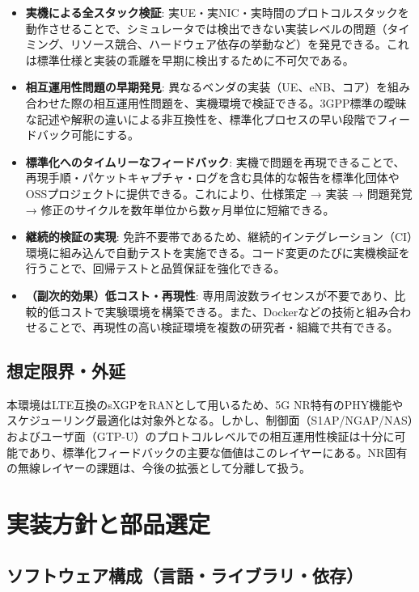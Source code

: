 \begin{itemize}
	\item \textbf{実機による全スタック検証}: 実UE・実NIC・実時間のプロトコルスタックを動作させることで、シミュレータでは検出できない実装レベルの問題（タイミング、リソース競合、ハードウェア依存の挙動など）を発見できる。これは標準仕様と実装の乖離を早期に検出するために不可欠である。

	\item \textbf{相互運用性問題の早期発見}: 異なるベンダの実装（UE、eNB、コア）を組み合わせた際の相互運用性問題を、実機環境で検証できる。3GPP標準の曖昧な記述や解釈の違いによる非互換性を、標準化プロセスの早い段階でフィードバック可能にする。

	\item \textbf{標準化へのタイムリーなフィードバック}: 実機で問題を再現できることで、再現手順・パケットキャプチャ・ログを含む具体的な報告を標準化団体やOSSプロジェクトに提供できる。これにより、仕様策定 → 実装 → 問題発覚 → 修正のサイクルを数年単位から数ヶ月単位に短縮できる。

	\item \textbf{継続的検証の実現}: 免許不要帯であるため、継続的インテグレーション（CI）環境に組み込んで自動テストを実施できる。コード変更のたびに実機検証を行うことで、回帰テストと品質保証を強化できる。

	\item \textbf{（副次的効果）低コスト・再現性}: 専用周波数ライセンスが不要であり、比較的低コストで実験環境を構築できる。また、Dockerなどの技術と組み合わせることで、再現性の高い検証環境を複数の研究者・組織で共有できる。
\end{itemize}

\subsection{想定限界・外延}
本環境はLTE互換のsXGPをRANとして用いるため、5G NR特有のPHY機能やスケジューリング最適化は対象外となる。しかし、制御面（S1AP/NGAP/NAS）およびユーザ面（GTP-U）のプロトコルレベルでの相互運用性検証は十分に可能であり、標準化フィードバックの主要な価値はこのレイヤーにある。NR固有の無線レイヤーの課題は、今後の拡張として分離して扱う。

\section{実装方針と部品選定}
\subsection{ソフトウェア構成（言語・ライブラリ・依存）}
